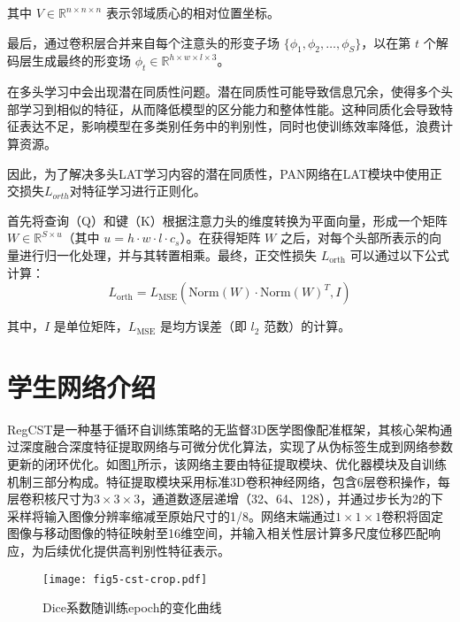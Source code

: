 其中 \( V \in \mathbb{R}^{n \times n \times n} \) 表示邻域质心的相对位置坐标。

最后，通过卷积层合并来自每个注意头的形变子场 \( \{ \phi_1, \phi_2, \ldots, \phi_S \} \)，以在第 \( t \) 个解码层生成最终的形变场 \( \phi_t \in \mathbb{R}^{h \times w \times l \times 3} \)。

在多头学习中会出现潜在同质性问题。潜在同质性可能导致信息冗余，使得多个头部学习到相似的特征，从而降低模型的区分能力和整体性能。这种同质化会导致特征表达不足，影响模型在多类别任务中的判别性，同时也使训练效率降低，浪费计算资源。

因此，为了解决多头LAT学习内容的潜在同质性，PAN网络在LAT模块中使用正交损失$L_{orth}$对特征学习进行正则化\cite{brock2016neural}。

首先将查询（Q）和键（K）根据注意力头的维度转换为平面向量，形成一个矩阵 \( W \in \mathbb{R}^{S \times u} \)（其中 \( u = h \cdot w \cdot l \cdot c_s \)）。在获得矩阵 \( W \) 之后，对每个头部所表示的向量进行归一化处理，并与其转置相乘。最终，正交性损失 \( L_{\text{orth}} \) 可以通过以下公式计算：
\begin{equation}
    L_{\text{orth}} = L_{\text{MSE}}\left(\text{Norm}(W) \cdot \text{Norm}(W)^T, I\right)
\end{equation}

其中，\( I \) 是单位矩阵，\( L_{\text{MSE}} \) 是均方误差（即 \( l_2 \) 范数）的计算。

\section{学生网络介绍}

RegCST\cite{bigalke2023unsupervised}是一种基于循环自训练策略的无监督3D医学图像配准框架，其核心架构通过深度融合深度特征提取网络与可微分优化算法，实现了从伪标签生成到网络参数更新的闭环优化。如图\ref{fig:regcst}所示，该网络主要由特征提取模块、优化器模块及自训练机制三部分构成。特征提取模块采用标准3D卷积神经网络，包含6层卷积操作，每层卷积核尺寸为$3 \times 3 \times 3$，通道数逐层递增（32、64、128），并通过步长为2的下采样将输入图像分辨率缩减至原始尺寸的1/8。网络末端通过$1 \times 1 \times 1$卷积将固定图像与移动图像的特征映射至16维空间，并输入相关性层计算多尺度位移匹配响应，为后续优化提供高判别性特征表示。

\begin{figure}[h]
    \centering
    \texttt{[image: fig5-cst-crop.pdf]}
    \caption{Dice系数随训练epoch的变化曲线}
    \label{fig:regcst}
\end{figure}

